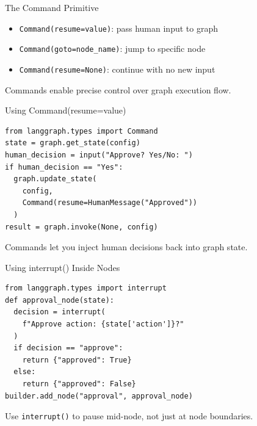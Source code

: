 \documentclass[aspectratio=169,11pt]{beamer}
\begin{document}
\begin{frame}{The Command Primitive}
  \begin{conceptbox}
    \setlength{\itemsep}{1pt}
    \begin{itemize}
      \item \texttt{Command(resume=value)}: pass human input to graph
      \item \texttt{Command(goto=node\_name)}: jump to specific node
      \item \texttt{Command(resume=None)}: continue with no new input
    \end{itemize}
  \end{conceptbox}
  \vspace{0.1cm}
  \begin{tipbox}
    Commands enable precise control over graph execution flow.
  \end{tipbox}
\end{frame}

\begin{frame}[fragile]{Using Command(resume=value)}
  \begin{codebox}
    \begin{lstlisting}
from langgraph.types import Command
state = graph.get_state(config)
human_decision = input("Approve? Yes/No: ")
if human_decision == "Yes":
  graph.update_state(
    config,
    Command(resume=HumanMessage("Approved"))
  )
result = graph.invoke(None, config)
    \end{lstlisting}
  \end{codebox}
  \vspace{0.1cm}
  \begin{tipbox}
    Commands let you inject human decisions back into graph state.
  \end{tipbox}
\end{frame}

\begin{frame}[fragile]{Using interrupt() Inside Nodes}
  \begin{codebox}
    \begin{lstlisting}
from langgraph.types import interrupt
def approval_node(state):
  decision = interrupt(
    f"Approve action: {state['action']}?"
  )
  if decision == "approve":
    return {"approved": True}
  else:
    return {"approved": False}
builder.add_node("approval", approval_node)
    \end{lstlisting}
  \end{codebox}
  \vspace{0.1cm}
  \begin{tipbox}
    Use \texttt{interrupt()} to pause mid-node, not just at node boundaries.
  \end{tipbox}
\end{frame}
\end{document}
